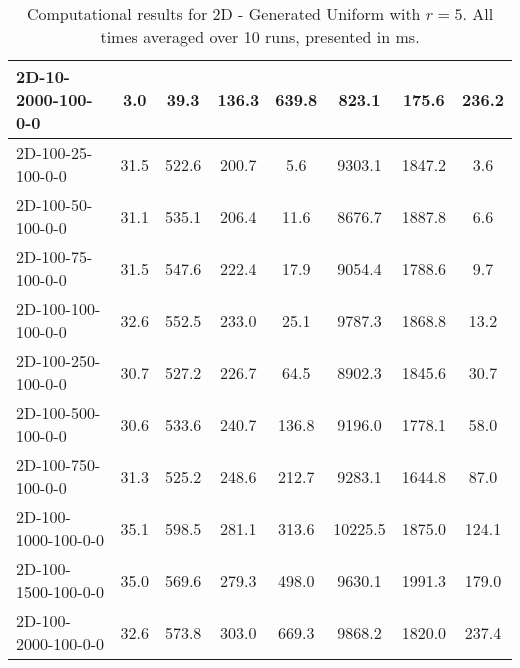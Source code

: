 \documentclass{article}
\begin{document}
\begin{table}[h]
\begin{center}
\begin{tabular}{|l||c|c|c|c|c|c|c|}
            2D-10-2000-100-0-0             & 3.0  & 39.3      & 136.3      & 639.8       & 823.1    & 175.6     & 236.2      \\
            \hline
            2D-100-25-100-0-0              & 31.5 & 522.6     & 200.7      & 5.6         & 9303.1   & 1847.2    & 3.6        \\
            2D-100-50-100-0-0              & 31.1 & 535.1     & 206.4      & 11.6        & 8676.7   & 1887.8    & 6.6        \\
            2D-100-75-100-0-0              & 31.5 & 547.6     & 222.4      & 17.9        & 9054.4   & 1788.6    & 9.7        \\
            2D-100-100-100-0-0             & 32.6 & 552.5     & 233.0      & 25.1        & 9787.3   & 1868.8    & 13.2       \\
            2D-100-250-100-0-0             & 30.7 & 527.2     & 226.7      & 64.5        & 8902.3   & 1845.6    & 30.7       \\
            2D-100-500-100-0-0             & 30.6 & 533.6     & 240.7      & 136.8       & 9196.0   & 1778.1    & 58.0       \\
            2D-100-750-100-0-0             & 31.3 & 525.2     & 248.6      & 212.7       & 9283.1   & 1644.8    & 87.0       \\
            2D-100-1000-100-0-0            & 35.1 & 598.5     & 281.1      & 313.6       & 10225.5  & 1875.0    & 124.1      \\
            2D-100-1500-100-0-0            & 35.0 & 569.6     & 279.3      & 498.0       & 9630.1   & 1991.3    & 179.0      \\
            2D-100-2000-100-0-0            & 32.6 & 573.8     & 303.0      & 669.3       & 9868.2   & 1820.0    & 237.4      \\
            \hline
        \end{tabular}
    \end{center}
    \caption{Computational results for 2D - Generated Uniform with $r=5$. All times averaged over 10 runs, presented in ms.}
\end{table}
\end{document}
